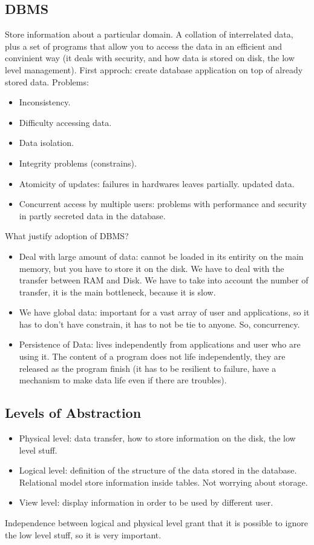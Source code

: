 \documentclass[11pt]{report}
\theoremstyle{definition}
\theoremstyle{remark}
\begin{document}
\subsection*{DBMS}
Store information about a particular domain. A collation of interrelated data, plus a set of programs that allow you to access the data in an efficient and convinient way (it deals with security, and how data is stored on disk, the low level management).
First approch: create database application on top of already stored data. Problems: 
\begin{itemize}
    \item Inconsistency.
    \item Difficulty accessing data.
    \item  Data isolation.
    \item Integrity problems (constrains).
    \item Atomicity of updates: failures in hardwares leaves partially. updated data.
    \item Concurrent access by multiple users: problems with performance and security in partly secreted data in the database.
\end{itemize}
What justify adoption of DBMS?
\begin{itemize}
    \item Deal with large amount of data: cannot be loaded in its entirity on the main memory, but you have to store it on the disk. We have to deal with the transfer between RAM and Disk. We have to take into account the number of transfer, it is the main bottleneck, because it is slow.
    \item We have global data: important for a vast array of user and applications, so it has to don't have constrain, it has to not be tie  to anyone. So, concurrency.
    \item Persistence of Data: lives independently from applications and user who are using it. The content of a program does not life independently, they are released as the program finish (it has to be resilient to failure, have a mechanism to make data life even if there are troubles).
\end{itemize}

\subsection*{Levels of Abstraction}
\begin{itemize}
    \item Physical level: data transfer, how to store information on the disk, the low level stuff. 
    \item Logical level: definition of the structure of the data stored in the database. Relational model store information inside tables. Not worrying about storage.
    \item View level: display information in order to be used by different user.
\end{itemize}
Independence between logical and physical level grant that it is possible to ignore the low level stuff, so it is very important. 
\end{document}
